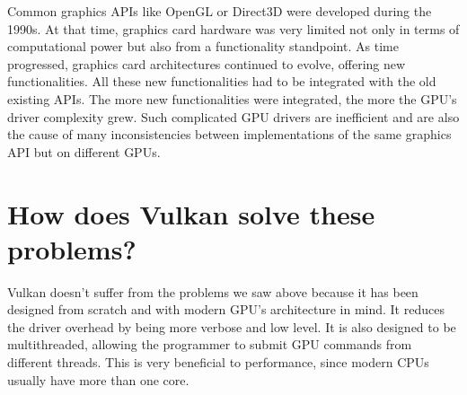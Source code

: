 Common graphics APIs like OpenGL or Direct3D were developed during the 1990s.
At that time, graphics card hardware was very limited not only in terms of computational
power but also from a functionality standpoint. As time progressed, graphics card architectures
continued to evolve, offering new functionalities.
All these new functionalities had to be integrated with the old existing APIs.
The more new functionalities were integrated, the more the GPU's driver complexity grew.
Such complicated GPU drivers are inefficient and are also the cause of many
inconsistencies between implementations of the same graphics API but on different GPUs.

\section{How does Vulkan solve these problems?}

Vulkan doesn't suffer from the problems we saw above because it has been designed from scratch
and with modern GPU's architecture in mind.
It reduces the driver overhead by being more verbose and low level.
It is also designed to be multithreaded, allowing the programmer to submit GPU commands from
different threads.
This is very beneficial to performance, since modern CPUs usually have more than one core.
